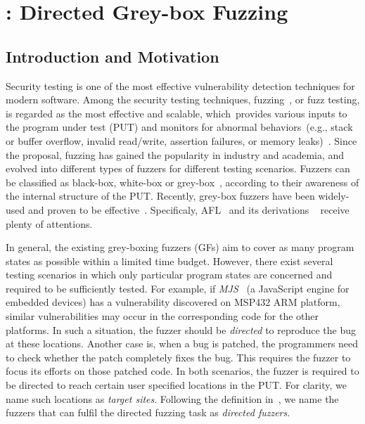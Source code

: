 
\chapter{\dFOT: Directed Grey-box Fuzzing} \label{ch:dfot}


\section{Introduction and Motivation}



Security testing is one of the most effective vulnerability detection techniques for modern software.
Among the security testing techniques, fuzzing~\cite{fuzzing1990}, or fuzz testing, is regarded as the most effective and scalable, which~provides various inputs to the program under test (PUT) and monitors for abnormal behaviors~(e.g., stack or buffer overflow, invalid read/write, assertion failures, or memory leaks)~\cite{fuzzSurvey}. 
Since the proposal, fuzzing has gained the popularity in industry and academia, and evolved into different types of fuzzers for different testing scenarios.
Fuzzers can be classified as black-box, white-box or grey-box~\cite{chen2018systematic}, according to their awareness of the internal structure of the PUT.
Recently, grey-box fuzzers have been widely-used and proven to be effective~\cite{Bohme:2016:CGF}.
Specificaly, AFL~\cite{afl} and its derivations ~\cite{Bohme:2016:CGF,Bohme:2017:DGF,junjie:2017sp:skyfire,2017arXiv170907101L,CollAFL,Angora} receive plenty of attentions.



In general, the existing grey-boxing fuzzers (GFs) aim to cover as many program states as possible within a limited time budget.
However, there exist several testing scenarios in which only particular program states are concerned and required to be sufficiently tested. 
For example, if \emph{MJS}~\cite{mjs} (a JavaScript engine for embedded devices) has a vulnerability discovered on MSP432 ARM platform, similar vulnerabilities may occur in the corresponding code for the other platforms.
In such a situation, the fuzzer should be \emph{directed} to reproduce the bug at these locations.
Another case is, when a bug is patched, the programmers need to check whether the patch completely fixes the bug. 
This requires the fuzzer to focus its efforts on those patched code.
In both scenarios, the fuzzer is required to be directed to reach certain user specified locations in the PUT.
For clarity, we name such locations as \emph{target sites}.
Following the definition in~\cite{Bohme:2017:DGF}, we name the fuzzers that can fulfil the directed fuzzing task as \emph{directed fuzzers}.




